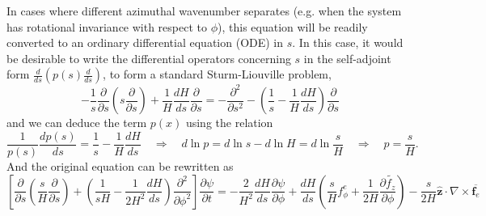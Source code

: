 In cases where different azimuthal wavenumber separates (e.g. when the system has rotational invariance with respect to $\phi$), this equation will be readily converted to an ordinary differential equation (ODE) in $s$. In this case, it would be desirable to write the differential operators concerning $s$ in the self-adjoint form $\frac{d}{ds}(p(s)\frac{d}{ds})$, to form a standard Sturm-Liouville problem,
\[
    -\frac{1}{s}\frac{\partial}{\partial s} \left(s \frac{\partial}{\partial s}\right) + \frac{1}{H} \frac{dH}{ds} \frac{\partial}{\partial s} = - \frac{\partial^2}{\partial s^2} - \left(\frac{1}{s} - \frac{1}{H}\frac{dH}{ds}\right) \frac{\partial}{\partial s}
\]
and we can deduce the term $p(x)$ using the relation
\[
    \frac{1}{p(s)}\frac{d p(s)}{ds} = \frac{1}{s} - \frac{1}{H}\frac{dH}{ds}\quad \Longrightarrow \quad d \ln p = d\ln s - d\ln H = d \ln \frac{s}{H} \quad \Longrightarrow\quad p = \frac{s}{H}.
\]
And the original equation can be rewritten as 
\begin{equation}
    \left[\frac{\partial}{\partial s}\left(\frac{s}{H}\frac{\partial}{\partial s}\right) + \left(\frac{1}{sH} - \frac{1}{2H^2} \frac{dH}{ds}\right)\frac{\partial^2}{\partial \phi^2}\right] \frac{\partial \psi}{\partial t} = - \frac{2}{H^2}\frac{dH}{ds} \frac{\partial \psi}{\partial \phi} + \frac{dH}{ds} \left(\frac{s}{H} f_\phi^e + \frac{1}{2H}\frac{\partial \widetilde{f_z}}{\partial \phi}\right) - \frac{s}{2H}\hat{\mathbf{z}}\cdot \nabla\times \overline{\mathbf{f}_e}
\end{equation}
